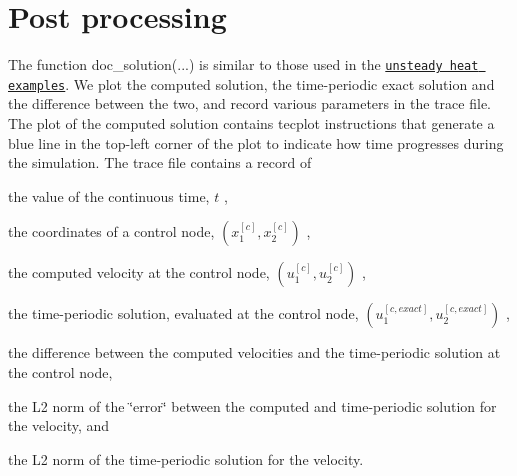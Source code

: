 \hypertarget{index_doc}{}\section{Post processing}\label{index_doc}
The function {\ttfamily doc\+\_\+solution}(...) is similar to those used in the \href{../../../unsteady_heat/two_d_unsteady_heat/html/index.html#doc}{\tt unsteady heat examples}. We plot the computed solution, the time-\/periodic exact solution and the difference between the two, and record various parameters in the trace file. The plot of the computed solution contains tecplot instructions that generate a blue line in the top-\/left corner of the plot to indicate how time progresses during the simulation. The trace file contains a record of
\begin{DoxyItemize}
\item the value of the continuous time, $ t $ ,
\item the coordinates of a control node, $ (x_1^{[c]},x_2^{[c]})$ ,
\item the computed velocity at the control node, $( u_1^{[c]},u_2^{[c]})$ ,
\item the time-\/periodic solution, evaluated at the control node, $ (u_1^{[c,exact]},u_2^{[c,exact]})$ ,
\item the difference between the computed velocities and the time-\/periodic solution at the control node,
\item the L2 norm of the \char`\"{}error\char`\"{} between the computed and time-\/periodic solution for the velocity, and
\item the L2 norm of the time-\/periodic solution for the velocity.
\end{DoxyItemize}


